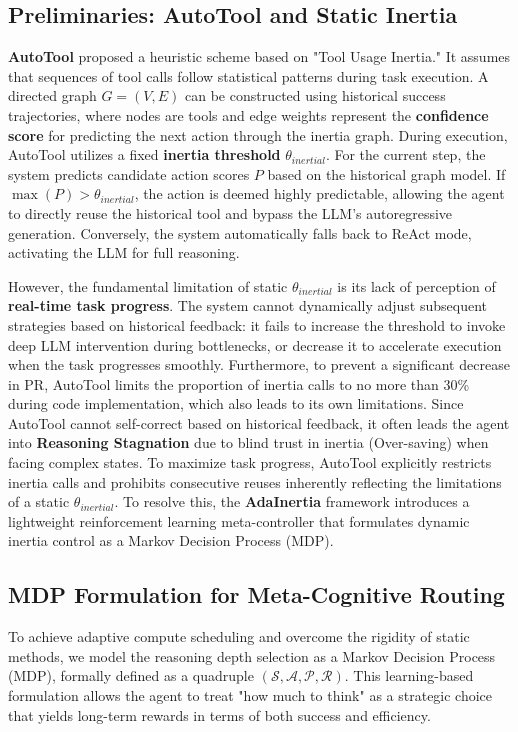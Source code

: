 \documentclass[runningheads]{llncs}
\begin{document}
\subsection{Preliminaries: AutoTool and Static Inertia}
\textbf{AutoTool} \cite{autotool} proposed a heuristic scheme based on "Tool Usage Inertia." It assumes that sequences of tool calls follow statistical patterns during task execution. A directed graph $G = (V, E)$ can be constructed using historical success trajectories, where nodes are tools and edge weights represent the \textbf{confidence score} for predicting the next action through the inertia graph. During execution, AutoTool utilizes a fixed \textbf{inertia threshold} $\theta_{inertial}$. For the current step, the system predicts candidate action scores $P$ based on the historical graph model. If $\max(P) > \theta_{inertial}$, the action is deemed highly predictable, allowing the agent to directly reuse the historical tool and bypass the LLM's autoregressive generation. Conversely, the system automatically falls back to ReAct \cite{react} mode, activating the LLM for full reasoning.

However, the fundamental limitation of static $\theta_{inertial}$ is its lack of perception of \textbf{real-time task progress}. The system cannot dynamically adjust subsequent strategies based on historical feedback: it fails to increase the threshold to invoke deep LLM intervention during bottlenecks, or decrease it to accelerate execution when the task progresses smoothly. Furthermore, to prevent a significant decrease in PR, AutoTool limits the proportion of inertia calls to no more than 30\% during code implementation, which also leads to its own limitations. Since AutoTool cannot self-correct based on historical feedback, it often leads the agent into \textbf{Reasoning Stagnation} due to blind trust in inertia (Over-saving) when facing complex states. To maximize task progress, AutoTool explicitly restricts inertia calls and prohibits consecutive reuses \cite{autotool} inherently reflecting the limitations of a static $\theta_{inertial}$. To resolve this, the \textbf{AdaInertia} framework introduces a lightweight reinforcement learning meta-controller that formulates dynamic inertia control as a Markov Decision Process (MDP).

\subsection{MDP Formulation for Meta-Cognitive Routing}
To achieve adaptive compute scheduling and overcome the rigidity of static methods, we model the reasoning depth selection as a Markov Decision Process (MDP), formally defined as a quadruple $(\mathcal{S}, \mathcal{A}, \mathcal{P}, \mathcal{R})$. This learning-based formulation allows the agent to treat "how much to think" as a strategic choice that yields long-term rewards in terms of both success and efficiency.
\end{document}
